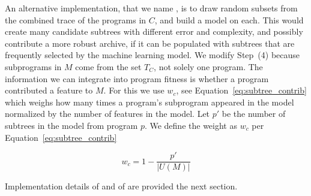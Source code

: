 An alternative implementation, that we name \DRAW,  is to draw random subsets from the combined trace of the programs in $C$, and build a model on each.  This would create many candidate subtrees with different error and complexity, and possibly contribute a more robust archive, if it can be populated with subtrees that are frequently selected by the machine learning model.  We modify Step~(4) because subprograms in $M$ come from the set $T_C$, not solely one program. The information we can integrate into program fitness is whether a program contributed a feature to $M$. For this we use $w_c$, see Equation~\ref{eq:subtree_contrib} which weighs how many times a program's subprogram appeared in the model normalized by the number of features in the model. Let $p'$ be the number of subtrees in the model from program $p$.  We define the weight as $w_c$ per Equation~\ref{eq:subtree_contrib}


\begin{equation}
\label{eq:subtree_contrib}
w_c = 1 - \frac{p'}{|U(M)|}
\end{equation}

Implementation details of \FULL and of \DRAW are provided the next section.  


